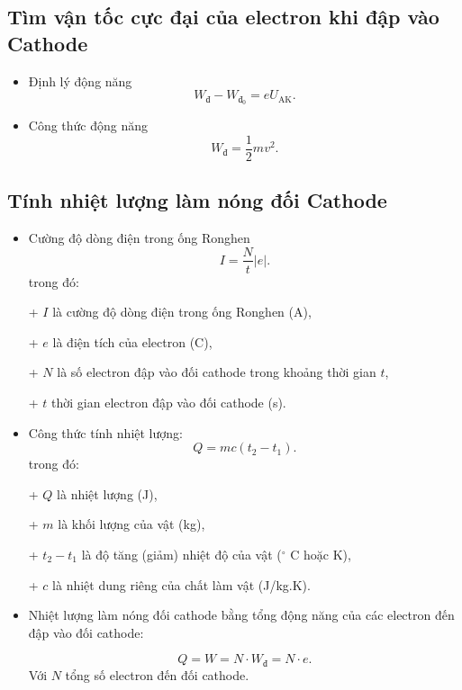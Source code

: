 \subsection{Tìm vận tốc cực đại của electron khi đập vào Cathode}

\begin{itemize}
	\item Định lý động năng
	\begin{equation}
		W_{\text{đ}}- W_{\text{đ}_0} =eU_{\text{AK}}.
	\end{equation}
	\item Công thức động năng
	\begin{equation}
		W_{\text{đ}}=\dfrac{1}{2}mv^2.
	\end{equation}
\end{itemize}


\subsection{Tính nhiệt lượng làm nóng đối Cathode}

\begin{itemize}
	\item Cường độ dòng điện trong ống Ronghen 
	\begin{equation}
		I = \dfrac{N}{t}|e|.
	\end{equation}
trong đó:

+ $I$ là cường độ dòng điện trong ống Ronghen (A),

+ $e$ là điện tích của electron (C),

+ $N$ là số electron đập vào đối cathode trong khoảng thời gian $t$,

+ $t$ thời gian electron đập vào đối cathode (s).
	\item Công thức tính nhiệt lượng: 
	\begin{equation}
		Q=mc(t_2-t_1).
	\end{equation}
trong đó:

+ $Q$ là nhiệt lượng (J),

+ $m$ là khối lượng của vật (kg),

+ $t_2-t_1$ là độ tăng (giảm) nhiệt độ của vật ($^\circ$ C hoặc K),

+ $c$ là nhiệt dung riêng của chất làm vật (J/kg.K).
	\item Nhiệt lượng làm nóng đối cathode bằng tổng động năng của các electron đến đập vào đối cathode:
	
	\begin{equation}
		Q = W = N\cdot W_{\text{đ}} = N\cdot e.
	\end{equation}
Với $N$ tổng số  electron đến đối cathode.

\end{itemize}

